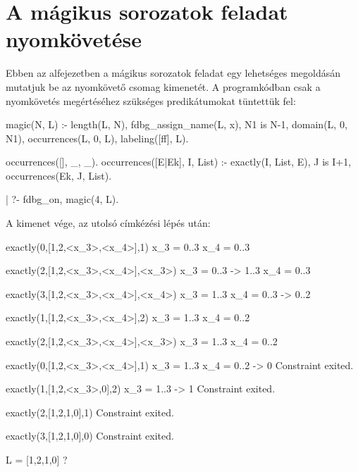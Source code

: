 \section{A mágikus sorozatok feladat nyomkövetése}

Ebben az alfejezetben a mágikus sorozatok feladat egy lehetséges megoldásán
mutatjuk be az \fdbg nyomkövető csomag kimenetét. A programkódban csak a 
nyomkövetés megértéséhez szükséges predikátumokat tüntettük fel:

\begin{prologcode}
magic(N, L) :-
        length(L, N),
        fdbg_assign_name(L, x), %
        N1 is N-1, domain(L, 0, N1),
        occurrences(L, 0, L),
        labeling([ff], L).

occurrences([], _, _).
occurrences([E|Ek], I, List) :-
        exactly(I, List, E), J is I+1,
        occurrences(Ek, J, List).

| ?- fdbg_on, magic(4, L).
\end{prologcode}

A kimenet vége, az utolsó címkézési lépés után:

\begin{prologcode}
exactly(0,[1,2,<x_3>,<x_4>],1)          x_3 = 0..3
                                        x_4 = 0..3
\end{prologcode}
\begin{prologcode}
exactly(2,[1,2,<x_3>,<x_4>],<x_3>)      x_3 = 0..3 -> 1..3
                                        x_4 = 0..3        
\end{prologcode}
\begin{prologcode}
exactly(3,[1,2,<x_3>,<x_4>],<x_4>)      x_3 = 1..3        
                                        x_4 = 0..3 -> 0..2
\end{prologcode}
\begin{prologcode}
exactly(1,[1,2,<x_3>,<x_4>],2)          x_3 = 1..3
                                        x_4 = 0..2
\end{prologcode}
\begin{prologcode}
exactly(2,[1,2,<x_3>,<x_4>],<x_3>)      x_3 = 1..3
                                        x_4 = 0..2
\end{prologcode}
\begin{prologcode}
exactly(0,[1,2,<x_3>,<x_4>],1)          x_3 = 1..3        
                                        x_4 = 0..2 -> {0} 
                                        Constraint exited.
\end{prologcode}
\begin{prologcode}
exactly(1,[1,2,<x_3>,0],2)              x_3 = 1..3 -> {1} 
                                        Constraint exited.
\end{prologcode}
\begin{prologcode}
exactly(2,[1,2,1,0],1)                  Constraint exited.
\end{prologcode}
\begin{prologcode}
exactly(3,[1,2,1,0],0)                  Constraint exited.

L = [1,2,1,0] ? 
\end{prologcode}
